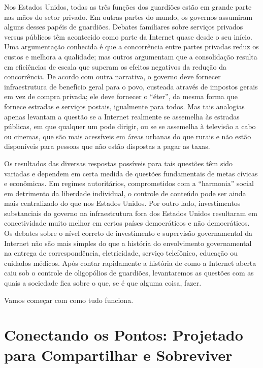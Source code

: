 Nos Estados Unidos, todas as três funções dos guardiões estão em grande parte nas mãos
do setor privado. Em outras partes do mundo, os governos assumiram alguns desses papéis
de guardiões. Debates familiares sobre serviços privados versus públicos têm acontecido
como parte da Internet quase desde o seu início. Uma argumentação conhecida é que a
concorrência entre partes privadas reduz os custos e melhora a qualidade; mas outros
argumentam que a consolidação resulta em eficiências de escala que superam os efeitos
negativos da redução da concorrência. De acordo com outra narrativa, o governo deve
fornecer infraestrutura de benefício geral para o povo, custeada através de impostos
gerais em vez de compra privada; ele deve fornecer o ``éter'', da mesma forma que fornece
estradas e serviços postais, igualmente para todos. Mas tais analogias apenas levantam a
questão se a Internet realmente se assemelha às estradas públicas, em que qualquer um
pode dirigir, ou se se assemelha à televisão a cabo ou cinemas, que são mais acessíveis
em áreas urbanas do que rurais e não estão disponíveis para pessoas que não estão
dispostas a pagar as taxas.

Os resultados das diversas respostas possíveis para tais questões têm sido variadas
e dependem em certa medida de questões fundamentais de metas cívicas e econômicas.
Em regimes autoritários, comprometidos com a ``harmonia'' social em detrimento da
liberdade individual, o controle de conteúdo pode ser ainda mais centralizado do que
nos Estados Unidos. Por outro lado, investimentos substanciais do governo na
infraestrutura fora dos Estados Unidos resultaram em conectividade muito melhor em
certos países democráticos e não democráticos. Os debates sobre o nível correto de
investimento e supervisão governamental da Internet não são mais simples do que a
história do envolvimento governamental na entrega de correspondência, eletricidade,
serviço telefônico, educação ou cuidados médicos. Após contar rapidamente a história
de como a Internet aberta caiu sob o controle de oligopólios de guardiões,
levantaremos as questões com as quais a sociedade fica sobre o que, se é que alguma
coisa, fazer.

Vamos começar com como tudo funciona.

\section{Conectando os Pontos: Projetado para Compartilhar e Sobreviver}
\label{gatekeepers:conectando-pontos}

